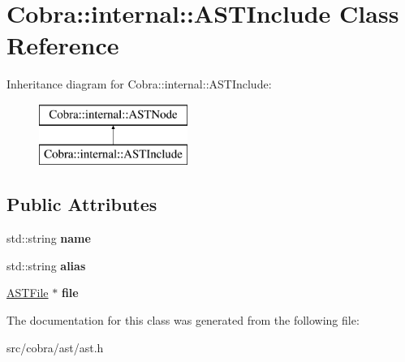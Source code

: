 \hypertarget{class_cobra_1_1internal_1_1_a_s_t_include}{\section{Cobra\+:\+:internal\+:\+:A\+S\+T\+Include Class Reference}
\label{class_cobra_1_1internal_1_1_a_s_t_include}
}
Inheritance diagram for Cobra\+:\+:internal\+:\+:A\+S\+T\+Include\+:\begin{figure}[H]
\begin{center}
\leavevmode
\includegraphics[height=2.000000cm]{class_cobra_1_1internal_1_1_a_s_t_include}
\end{center}
\end{figure}
\subsection*{Public Attributes}
\begin{DoxyCompactItemize}
\item 
\hypertarget{class_cobra_1_1internal_1_1_a_s_t_include_adebc903664510cde12c21e263a3b5df7}{std\+::string {\bfseries name}}\label{class_cobra_1_1internal_1_1_a_s_t_include_adebc903664510cde12c21e263a3b5df7}

\item 
\hypertarget{class_cobra_1_1internal_1_1_a_s_t_include_a194048f23414ee955145161fad552e21}{std\+::string {\bfseries alias}}\label{class_cobra_1_1internal_1_1_a_s_t_include_a194048f23414ee955145161fad552e21}

\item 
\hypertarget{class_cobra_1_1internal_1_1_a_s_t_include_a7af285224c23c6b86295d5434c6a9cc3}{\hyperlink{class_cobra_1_1internal_1_1_a_s_t_file}{A\+S\+T\+File} $\ast$ {\bfseries file}}\label{class_cobra_1_1internal_1_1_a_s_t_include_a7af285224c23c6b86295d5434c6a9cc3}

\end{DoxyCompactItemize}


The documentation for this class was generated from the following file\+:\begin{DoxyCompactItemize}
\item 
src/cobra/ast/ast.\+h\end{DoxyCompactItemize}

